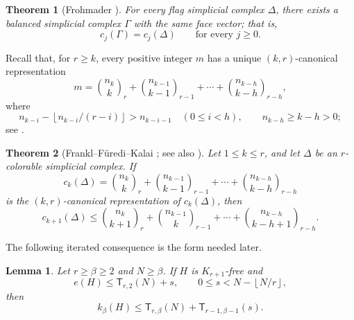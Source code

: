 \documentclass[11pt]{article}
\newtheorem{theorem}{Theorem}[section]
\newtheorem{lemma}[lemma]{Lemma}
\theoremstyle{definition}
\newcommand{\floor}[1]{\left\lfloor #1\right\rfloor}
\newcommand{\turcl}[3]{\mathsf{T}_{#1,#2}(#3)}
\begin{document}
\begin{theorem}[Frohmader {\cite[Theorem~1.1]{Frohmader2008}}]
For every flag simplicial complex $\Delta$, there exists a balanced
simplicial complex $\Gamma$ with the same face vector; that is,
\[
 c_j(\Gamma)=c_j(\Delta)
 \qquad\text{for every }j\ge0.
\]
\end{theorem}

Recall that, for $r\ge k$, every positive integer $m$ has a unique
$(k,r)$-canonical representation
\[
 m=
 \binom{n_k}{k}_r+
 \binom{n_{k-1}}{k-1}_{r-1}+\cdots+
 \binom{n_{k-h}}{k-h}_{r-h},
\]
where
\[
 n_{k-i}-\floor{n_{k-i}/(r-i)}>n_{k-i-1}
 \quad(0\le i<h),
 \qquad
 n_{k-h}\ge k-h>0;
\]
see \cite[Lemma~3.6]{Frohmader2008}.

\begin{theorem}[Frankl--F\"uredi--Kalai
{\cite{FranklFurediKalai1988}; see also
\cite[Theorem~3.7]{Frohmader2008}}]\label{thm:ffk}
Let $1\le k\le r$, and let $\Delta$ be an $r$-colorable
simplicial complex. If
\[
 c_k(\Delta)=
 \binom{n_k}{k}_r+
 \binom{n_{k-1}}{k-1}_{r-1}+\cdots+
 \binom{n_{k-h}}{k-h}_{r-h}
\]
is the $(k,r)$-canonical representation of $c_k(\Delta)$, then
\[
 c_{k+1}(\Delta)\le
 \binom{n_k}{k+1}_r+
 \binom{n_{k-1}}{k}_{r-1}+\cdots+
 \binom{n_{k-h}}{k-h+1}_{r-h}.
\]
\end{theorem}

The following iterated consequence is the form needed later.
\begin{lemma}\label{lem:general-ffk}
Let $r\ge\beta\ge2$ and $N\ge\beta$. If $H$ is $K_{r+1}$-free and
\[
 e(H)\le\turcl{r}{2}{N}+s,
 \qquad 0\le s<N-\floor{N/r},
\]
then
\begin{equation}\label{eq:general-ffk}
 k_\beta(H)\le\turcl{r}{\beta}{N}
                  +\turcl{r-1}{\beta-1}{s}.
\end{equation}
\end{lemma}
\end{document}
